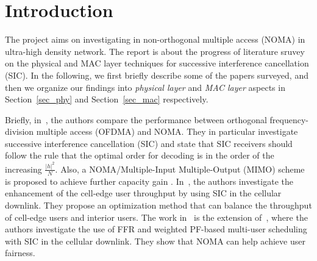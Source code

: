 \section{Introduction}
\label{sec_introduction}

The project aims on investigating in non-orthogonal multiple access (NOMA)
in ultra-high density network. The report is about the progress of
literature sruvey on the physical and MAC layer techniques for
successive interference cancellation (SIC).
In the following, we first briefly describe some of the papers surveyed, and then we organize our findings into
{\em physical layer} and {\em MAC layer} aspects in Section~\ref{sec_phy} and
Section~\ref{sec_mac} respectively.
%
%

Briefly,
in~\cite{cite_docomo1}, the authors compare the performance between orthogonal 
frequency-division multiple access (OFDMA) and NOMA. They in particular
investigate successive interference cancellation (SIC) and state that
SIC receivers should follow the rule that the optimal order for decoding
is in the order of the increasing $\frac{|h|^2}{N}$. Also, a NOMA/Multiple-Input
Multiple-Output (MIMO) scheme is proposed to achieve further capacity gain
\cite{Non-orthogonal_Access_with_Random_Beamforming_and_Intra-beam_SIC_for_Cellular_MIMO_Downlink}.
In~\cite{cite_docomo2}, the authors investigate the enhancement of the
cell-edge user throughput by using SIC in  the cellular downlink. They
propose an optimization method that can balance the throughput of cell-edge
users and interior users. The work in~\cite{cite_docomo3} is the extension
of~\cite{cite_docomo2}, where the authors investigate the use of FFR and
weighted PF-based multi-user scheduling with SIC in the cellular downlink.
They show that NOMA can help achieve user fairness.
%
%

